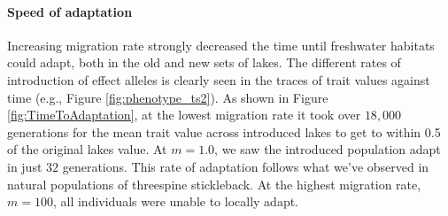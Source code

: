\documentclass{article}
\begin{document}

\paragraph*{Speed of adaptation}
Increasing migration rate strongly decreased the time until freshwater habitats could adapt,
both in the old and new sets of lakes.
The different rates of introduction of effect alleles is clearly seen in the traces
of trait values against time (e.g., Figure \ref{fig:phenotype_ts2}).
As shown in Figure \ref{fig:TimeToAdaptation}, at the lowest migration rate 
it took over $18,000$ generations for the mean trait value across introduced lakes to 
get to within 0.5 of the original lakes value.
At $m = 1.0$, we saw the introduced population adapt in just $32$ generations. 
This rate of adaptation follows what we've observed in natural populations of threespine stickleback.
At the highest migration rate, $m = 100$, all individuals were unable to locally adapt.
\end{document}
